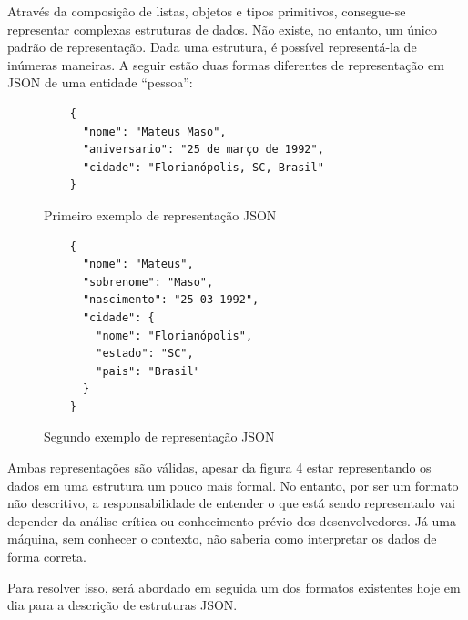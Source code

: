 Através da composição de listas, objetos e tipos primitivos, consegue-se representar complexas estruturas de dados. Não existe, no entanto, um único padrão de representação. Dada uma estrutura, é possível representá-la de inúmeras maneiras. A seguir estão duas formas diferentes de representação em JSON de uma entidade “pessoa”:
 \cite{Droettboom2015}

\begin{figure}[H]
  \centering
  \begin{verbatim}
    {
      "nome": "Mateus Maso",
      "aniversario": "25 de março de 1992",
      "cidade": "Florianópolis, SC, Brasil"
    }
  \end{verbatim}
  \caption{Primeiro exemplo de representação JSON}
\end{figure}

\begin{figure}[H]
  \centering
  \begin{verbatim}
    {
      "nome": "Mateus",
      "sobrenome": "Maso",
      "nascimento": "25-03-1992",
      "cidade": {
        "nome": "Florianópolis",
        "estado": "SC",
        "pais": "Brasil"
      }
    }
  \end{verbatim}
  \caption{Segundo exemplo de representação JSON}
\end{figure}

Ambas representações são válidas, apesar da figura 4 estar representando os dados em uma estrutura um pouco mais formal. No entanto, por ser um formato não descritivo, a responsabilidade de entender o que está sendo representado vai depender da análise crítica ou conhecimento prévio dos desenvolvedores. Já uma máquina, sem conhecer o contexto, não saberia como interpretar os dados de forma correta. \cite{Droettboom2015}

Para resolver isso, será abordado em seguida um dos formatos existentes hoje em dia para a descrição de estruturas JSON.

